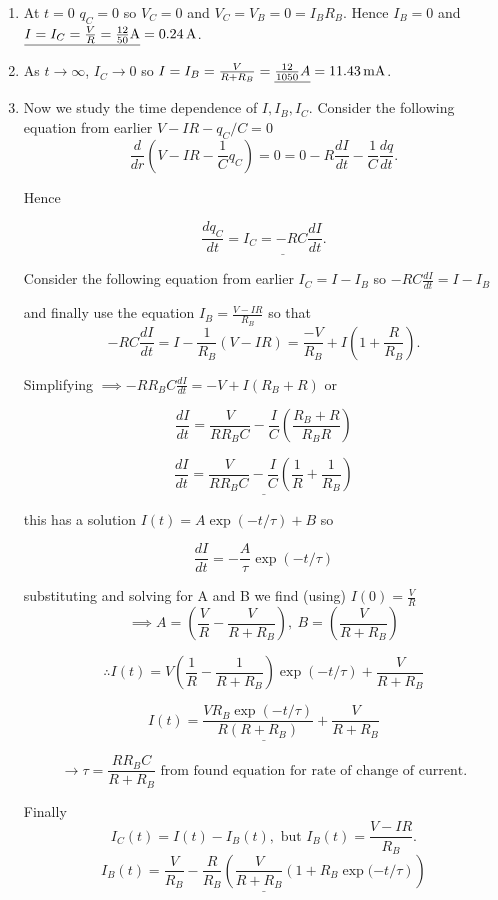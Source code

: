\begin{enumerate}
	\item  At $t=0$ $q_C=0$ so $V_C=0$ and $V_C=V_B=0=I_BR_B$. Hence $I_B=0$ and $\underline{I=I_C=\frac{V}{R}=\frac{12}{50}\textrm{A}}=0.24\,\mathrm{A}$.
	\vspace{5mm}
	
	\item As $t\rightarrow \infty$, $I_C\rightarrow 0$ so $I=I_B=\frac{V}{R+R_B}=\underline{\frac{12}{1050}A}=11.43\,\mathrm{mA}$.
	\vspace{5mm}
	
	\item Now we study the time dependence of $I,I_B,I_C$. Consider the following equation from earlier $V-IR-q_C/C=0$
	$$\frac{d}{dr}\left(V-IR-\frac{1}{C}{q_C}\right)=0=0-R\frac{dI}{dt}-\frac{1}{C}\frac{dq}{dt}.$$
	
	Hence
	
	$$\frac{dq_C}{dt}=\underline{I_C=-RC\frac{dI}{dt}}.$$
	
	Consider the following equation from earlier $I_C=I-I_B$ so $-RC\frac{dI}{dt}=I-I_B$
	
	and finally use the equation $I_B=\frac{V-IR}{R_B}$ so that $$-RC\frac{dI}{dt}=I-\frac{1}{R_B}(V-IR)=\frac{-V}{R_B}+I(1+\frac{R}{R_B}).$$
	
	Simplifying $\implies -RR_BC\frac{dI}{dt}=-V+I(R_B+R)$ or 
	
	$$\frac{dI}{dt}=\frac{V}{RR_BC}-\frac{I}{C}\left(\frac{R_B+R}{R_BR}\right)$$
	
	$$\underline{\frac{dI}{dt}=\frac{V}{RR_BC}-\frac{I}{C} \left(\frac{1}{R}+\frac{1}{R_B}\right)}$$
	
	this has a solution $I(t)=A\exp(-t/\tau)+B$ so
	
	$$\frac{dI}{dt}=-\frac{A}{\tau}\exp(-t/\tau)$$
	
	substituting and solving for A and B we find (using) $I(0)=\frac{V}{R}$
	$$\implies A= \left(\frac{V}{R}-\frac{V}{R+R_B}\right), \: B=\left(\frac{V}{R+R_B}\right)$$
	
	$$\therefore I(t)=V\left(\frac{1}{R}-\frac{1}{R+R_B}\right)\exp(-t/\tau)+\frac{V}{R+R_B}$$
	
	$$\underline{I(t) = \frac{VR_B\exp(-t/\tau)}{R(R+R_B)}+\frac{V}{R+R_B}}$$
	
	$$\rightarrow \tau=\frac{RR_BC}{R+R_B} \textrm{ from found equation for rate of change of current.}$$
	
	Finally
	$$I_C(t)=I(t)-I_B(t),\textrm{ but } I_B(t)=\frac{V-IR}{R_B}.$$
	$$\underline{I_B(t)=\frac{V}{R_B}-\frac{R}{R_B}\left(\frac{V}{R+R_B}\left(1+R_B\exp(-t/\tau\right)\right)}$$
	

\end{enumerate}
